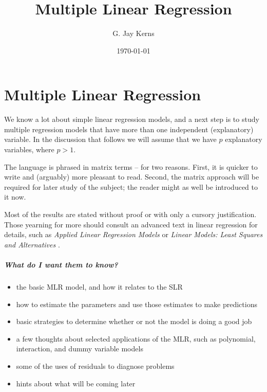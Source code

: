 \documentclass[captions=tableheading]{scrbook}
\title{Multiple Linear Regression}
\author{G. Jay Kerns}
\date{\today}
\begin{document}
\maketitle


\chapter{Multiple Linear Regression}
\label{sec-1}

\label{cha:multiple-linear-regression}


\noindent We know a lot about simple linear regression models, and a next step is to study multiple regression models that have more than one independent (explanatory) variable. In the discussion that follows we will assume that we have $p$ explanatory variables, where $p>1$.

The language is phrased in matrix terms -- for two reasons. First, it is quicker to write and (arguably) more pleasant to read. Second, the matrix approach will be required for later study of the subject; the reader might as well be introduced to it now.

Most of the results are stated without proof or with only a cursory justification. Those yearning for more should consult an advanced text in linear regression for details, such as \emph{Applied Linear Regression Models} \cite{Neter1996}or \emph{Linear Models: Least Squares and Alternatives} \cite{Rao1999}.


\paragraph*{What do I want them to know?}

\begin{itemize}
\item the basic MLR model, and how it relates to the SLR
\item how to estimate the parameters and use those estimates to make predictions
\item basic strategies to determine whether or not the model is doing a good job
\item a few thoughts about selected applications of the MLR, such as polynomial, interaction, and dummy variable models
\item some of the uses of residuals to diagnose problems
\item hints about what will be coming later
\end{itemize}
\end{document}
